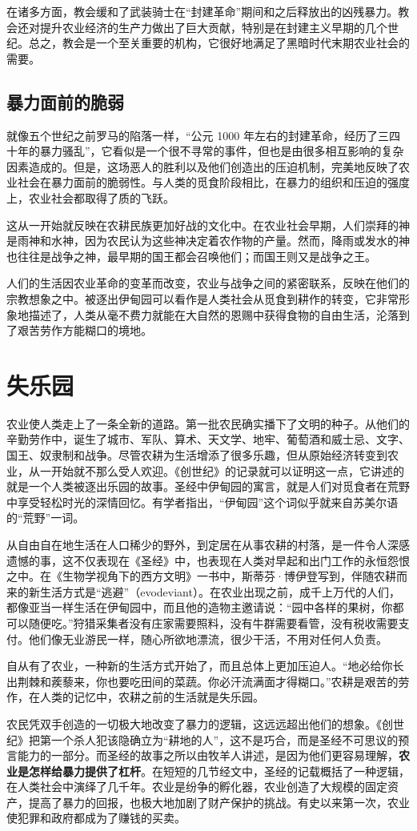 在诸多方面，教会缓和了武装骑士在“封建革命”期间和之后释放出的凶残暴力。教会还对提升农业经济的生产力做出了巨大贡献，特别是在封建主义早期的几个世纪。总之，教会是一个至关重要的机构，它很好地满足了黑暗时代末期农业社会的需要。

\subsection{暴力面前的脆弱}
就像五个世纪之前罗马的陷落一样，“公元 1000 年左右的封建革命，经历了三四十年的暴力骚乱”，它看似是一个很不寻常的事件，但也是由很多相互影响的复杂因素造成的。但是，这场恶人的胜利以及他们创造出的压迫机制，完美地反映了农业社会在暴力面前的脆弱性。与人类的觅食阶段相比，在暴力的组织和压迫的强度上，农业社会都取得了质的飞跃。

这从一开始就反映在农耕民族更加好战的文化中。在农业社会早期，人们崇拜的神是雨神和水神，因为农民认为这些神决定着农作物的产量。然而，降雨或发水的神也往往是战争之神，最早期的国王都会召唤他们；而国王则又是战争之王。

人们的生活因农业革命的变革而改变，农业与战争之间的紧密联系，反映在他们的宗教想象之中。被逐出伊甸园可以看作是人类社会从觅食到耕作的转变，它非常形象地描述了，人类从毫不费力就能在大自然的恩赐中获得食物的自由生活，沦落到了艰苦劳作方能糊口的境地。

\section{失乐园}
农业使人类走上了一条全新的道路。第一批农民确实播下了文明的种子。从他们的辛勤劳作中，诞生了城市、军队、算术、天文学、地牢、葡萄酒和威士忌、文字、国王、奴隶制和战争。尽管农耕为生活增添了很多乐趣，但从原始经济转变到农业，从一开始就不那么受人欢迎。《创世纪》的记录就可以证明这一点，它讲述的就是一个人类被逐出乐园的故事。圣经中伊甸园的寓言，就是人们对觅食者在荒野中享受轻松时光的深情回忆。有学者指出，“伊甸园”这个词似乎就来自苏美尔语的“荒野”一词。

从自由自在地生活在人口稀少的野外，到定居在从事农耕的村落，是一件令人深感遗憾的事，这不仅表现在《圣经》中，也表现在人类对早起和出门工作的永恒怨恨之中。在《生物学视角下的西方文明》一书中，斯蒂芬·博伊登写到，伴随农耕而来的新生活方式是“逃避”（evodeviant）。在农业出现之前，成千上万代的人们，都像亚当一样生活在伊甸园中，而且他的造物主邀请说：“园中各样的果树，你都可以随便吃。”狩猎采集者没有庄家需要照料，没有牛群需要看管，没有税收需要支付。他们像无业游民一样，随心所欲地漂流，很少干活，不用对任何人负责。

自从有了农业，一种新的生活方式开始了，而且总体上更加压迫人。“地必给你长出荆棘和蒺藜来，你也要吃田间的菜蔬。你必汗流满面才得糊口。”农耕是艰苦的劳作，在人类的记忆中，农耕之前的生活就是失乐园。

农民凭双手创造的一切极大地改变了暴力的逻辑，这远远超出他们的想象。《创世纪》把第一个杀人犯该隐确立为“耕地的人”，这不是巧合，而是圣经不可思议的预言能力的一部分。而圣经的故事之所以由牧羊人讲述，是因为他们更容易理解，\textbf{农业是怎样给暴力提供了杠杆}。在短短的几节经文中，圣经的记载概括了一种逻辑，在人类社会中演绎了几千年。农业是纷争的孵化器，农业创造了大规模的固定资产，提高了暴力的回报，也极大地加剧了财产保护的挑战。有史以来第一次，农业使犯罪和政府都成为了赚钱的买卖。